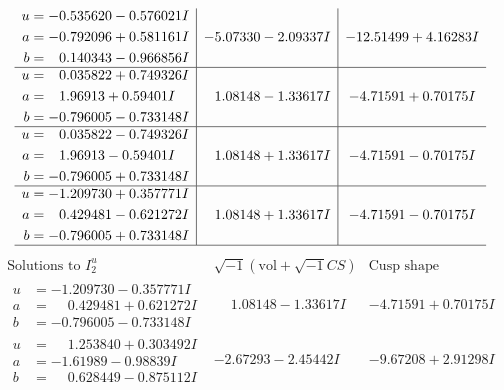 \documentclass[1p]{elsarticle_modified}
\theoremstyle{definition}
\newcommand{\I}{\sqrt{-1}}
\begin{document}
$$\begin{array}{c|c|c}
\begin{aligned}
u &= -0.535620 - 0.576021 I \\
a &= -0.792096 + 0.581161 I \\
b &= \phantom{-}0.140343 - 0.966856 I\end{aligned}
 & -5.07330 - 2.09337 I & -12.51499 + 4.16283 I \\ \hline\begin{aligned}
u &= \phantom{-}0.035822 + 0.749326 I \\
a &= \phantom{-}1.96913 + 0.59401 I \\
b &= -0.796005 - 0.733148 I\end{aligned}
 & \phantom{-}1.08148 - 1.33617 I & -4.71591 + 0.70175 I \\ \hline\begin{aligned}
u &= \phantom{-}0.035822 - 0.749326 I \\
a &= \phantom{-}1.96913 - 0.59401 I \\
b &= -0.796005 + 0.733148 I\end{aligned}
 & \phantom{-}1.08148 + 1.33617 I & -4.71591 - 0.70175 I \\ \hline\begin{aligned}
u &= -1.209730 + 0.357771 I \\
a &= \phantom{-}0.429481 - 0.621272 I \\
b &= -0.796005 + 0.733148 I\end{aligned}
 & \phantom{-}1.08148 + 1.33617 I & -4.71591 - 0.70175 I\\
 \hline 
 \end{array}$$\newpage$$\begin{array}{c|c|c}  
\text{Solutions to }I^u_{2}& \I (\text{vol} + \sqrt{-1}CS) & \text{Cusp shape}\\
 \hline 
\begin{aligned}
u &= -1.209730 - 0.357771 I \\
a &= \phantom{-}0.429481 + 0.621272 I \\
b &= -0.796005 - 0.733148 I\end{aligned}
 & \phantom{-}1.08148 - 1.33617 I & -4.71591 + 0.70175 I \\ \hline\begin{aligned}
u &= \phantom{-}1.253840 + 0.303492 I \\
a &= -1.61989 - 0.98839 I \\
b &= \phantom{-}0.628449 - 0.875112 I\end{aligned}
 & -2.67293 - 2.45442 I & -9.67208 + 2.91298 I \\ \hline\begin{aligned}

\end{aligned}
\end{array}$$
\end{document}
